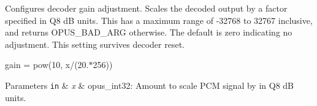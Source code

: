 Configures decoder gain adjustment. Scales the decoded output by a factor specified in Q8 dB units. This has a maximum range of -\/32768 to 32767 inclusive, and returns O\+P\+U\+S\+\_\+\+B\+A\+D\+\_\+\+A\+RG otherwise. The default is zero indicating no adjustment. This setting survives decoder reset.

gain = pow(10, x/(20.$\ast$256))


\begin{DoxyParams}[1]{Parameters}
\mbox{\tt in}  & {\em x} & {\ttfamily opus\+\_\+int32}\+: Amount to scale P\+CM signal by in Q8 dB units. \\
\hline
\end{DoxyParams}
